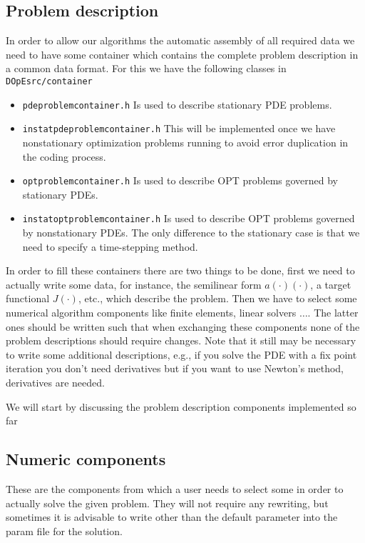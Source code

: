 \subsection{Problem description}
In order to allow our algorithms the automatic assembly of all required 
data we need to have some container which contains the complete problem 
description in a common data format. For this we have the following 
classes in \texttt{DOpEsrc/container}
\begin{itemize}
  \item \texttt{pdeproblemcontainer.h} Is used to describe  stationary PDE problems.
  \item \texttt{instatpdeproblemcontainer.h} 
This will be implemented once we have nonstationary optimization problems running to avoid error duplication in the coding process.
  \item \texttt{optproblemcontainer.h} Is used to describe  OPT problems governed by 
    stationary PDEs. 
  \item \texttt{instatoptproblemcontainer.h} Is used to describe  OPT problems governed by nonstationary PDEs. The only difference to the stationary case is that we need to specify a time-stepping method.  
\end{itemize}
In order to fill these containers there are two things to be done,
first we need to actually write some data, for instance,
the semilinear form $a(\cdot)(\cdot)$, a target functional $J(\cdot)$, etc.,
which describe the problem. Then we have to select some numerical 
algorithm components like finite elements, linear solvers $\ldots$.
The latter ones should be written such that when exchanging these components
none of the problem descriptions should require changes. 
Note that it still may be necessary to write some additional descriptions, 
e.g., if you solve the PDE with a fix point iteration you don't need derivatives
but if you want to use Newton's method, derivatives are needed.

We will start by discussing the problem description components implemented so far


\subsection{Numeric components}
These are the components from which a user needs to select some in order to actually 
solve the given problem. They will not require any rewriting, but sometimes it is 
advisable to write other than the default parameter into the param file for the 
solution.

